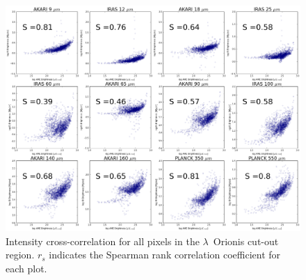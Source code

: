                 \begin{figure}
                  \includegraphics[width=\textwidth]{../Plots/orionis_correlations_AME.png}
                  \centering
                  \caption{Intensity cross-correlation for all pixels in the $\lambda$~Orionis cut-out region.  $r_{s}$ indicates the Spearman rank correlation coefficient for each plot.}
                  \label{fig:orionis-corr}
                \end{figure}
